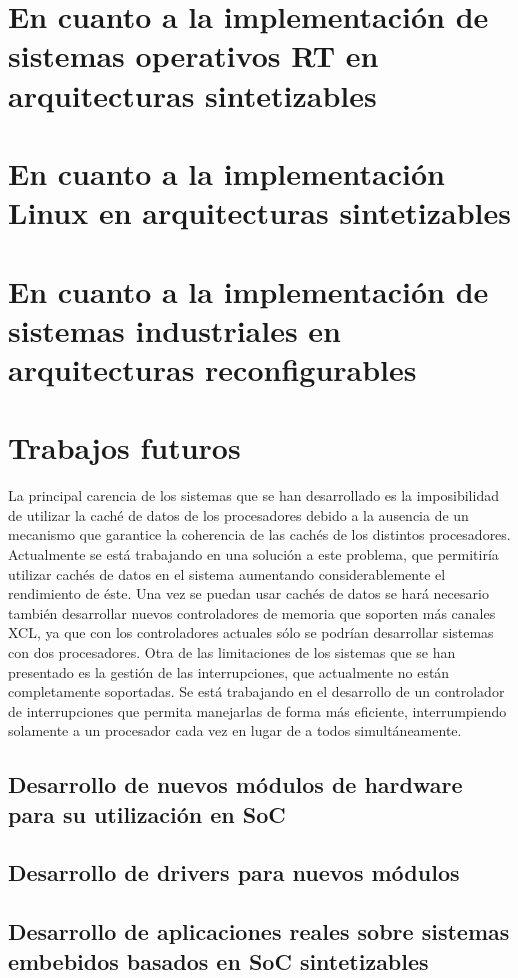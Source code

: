 	\section{En cuanto a la implementación de sistemas operativos RT en arquitecturas sintetizables} 
		

	
	\section{En cuanto a la implementación Linux en arquitecturas sintetizables} 
		
		
		

	\section{En cuanto a la implementación de sistemas industriales en arquitecturas reconfigurables} 



	\section{Trabajos futuros}

La principal carencia de los sistemas que se han desarrollado es la imposibilidad de utilizar la caché de datos de los procesadores debido a la
ausencia de un mecanismo que garantice la coherencia de las cachés de los distintos procesadores. Actualmente se está trabajando en una solución a
este problema, que permitiría utilizar cachés de datos en el sistema aumentando considerablemente el rendimiento de éste. Una vez se puedan usar
cachés de datos se hará necesario también desarrollar nuevos controladores de memoria que soporten más canales XCL, ya que con los controladores
actuales sólo se podrían desarrollar sistemas con dos procesadores. Otra de las limitaciones de los sistemas que se han presentado es la gestión de
las interrupciones, que actualmente no están completamente soportadas. Se está trabajando en el desarrollo de un controlador de interrupciones que
permita manejarlas de forma más eficiente, interrumpiendo solamente a un procesador cada vez en lugar de a todos simultáneamente.

		\subsection{Desarrollo de nuevos módulos de hardware para su utilización en SoC}
		
		\subsection{Desarrollo de drivers para nuevos módulos}
		
		\subsection{Desarrollo de aplicaciones reales sobre sistemas embebidos basados en SoC sintetizables}
		
		
	
	 